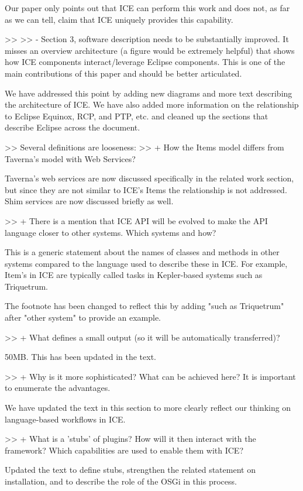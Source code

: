 Our paper only points out that ICE can perform this work and does not, as far as we can tell, claim that ICE uniquely provides this capability. 

>> 
>> - Section 3, software description needs to be substantially improved. It misses an overview architecture (a figure would be extremely helpful) that shows how ICE components interact/leverage Eclipse components. This is one of the main contributions of this paper and should be better articulated.

We have addressed this point by adding new diagrams and more text describing the architecture of ICE. We have also added more information on the relationship to Eclipse Equinox, RCP, and PTP, etc. and cleaned up the sections that describe Eclipse across the document.

>> Several definitions are looseness:
>> + How the Items model differs from Taverna's model with Web Services?

Taverna's web services are now discussed specifically in the related work section, but since they are not similar to ICE's Items the relationship is not addressed. Shim services are now discussed briefly as well.

>> + There is a mention that ICE API will be evolved to make the API language closer to other systems. Which systems and how?

This is a generic statement about the names of classes and methods in other systems compared to the language used to describe these in ICE. For example, Item's in ICE are typically called tasks in Kepler-based systems such as Triquetrum. 

The footnote has been changed to reflect this by adding "such as Triquetrum" after "other system" to provide an example.

>> + What defines a small output (so it will be automatically transferred)?

50MB. This has been updated in the text.

>> + Why is it more sophisticated? What can be achieved here? It is important to enumerate the advantages.

We have updated the text in this section to more clearly reflect our thinking on language-based workflows in ICE.

>> + What is a 'stubs' of plugins? How will it then interact with the framework? Which capabilities are used to enable them with ICE?

Updated the text to define stubs, strengthen the related statement on installation, and to describe the role of the OSGi in this process.

